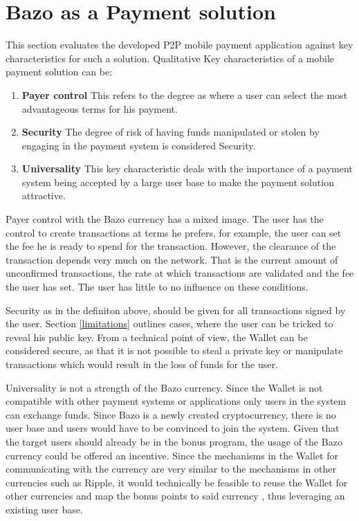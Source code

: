 \section{Bazo as a Payment solution}
This section evaluates the developed P2P mobile payment application against key characteristics for such a solution. Qualitative Key characteristics of a mobile payment solution can be:
\begin{enumerate}
\item \textbf{Payer control}
This refers to the degree as where a user can select the most advantageous terms for his payment.
\item \textbf{Security}
The degree of risk of having funds manipulated or stolen by engaging in the payment system is considered Security.
\item \textbf{Universality}
This key characteristic deals with the importance of a payment system being accepted by a large user base to make the payment solution attractive.
\end{enumerate}

Payer control with the Bazo currency has a mixed image.
The user has the control to create transactions at terms he prefers, for example, the user can set the fee he is ready to spend for the transaction. However, the clearance of the transaction depends very much on the network. That is the current amount of unconfirmed transactions, the rate at which transactions are validated and the fee the user has set. The user has little to no influence on these conditions.

Security as in the definiton above, should be given for all transactions signed by the user. Section \ref{limitations} outlines cases, where the user can be tricked to reveal his public key. From a technical point of view, the Wallet can be considered secure, as that it is not possible to steal a private key or manipulate transactions which would result in the loss of funds for the user.

Universality is not a strength of the Bazo currency. Since the Wallet is not compatible with other payment systems or applications only users in the system can exchange funds. Since Bazo is a newly created cryptocurrency, there is no user base and users would have to be convinced to join the system. Given that the target users should already be in the bonus program, the usage of the Bazo currency could be offered an incentive. Since the mechanisms in the Wallet for communicating with the currency are very similar to the mechanisms in other currencies such as Ripple, it would technically be feasible to reuse the Wallet for other currencies and map the bonus points to said currency \cite{ripplelib}, thus leveraging an existing user base.

